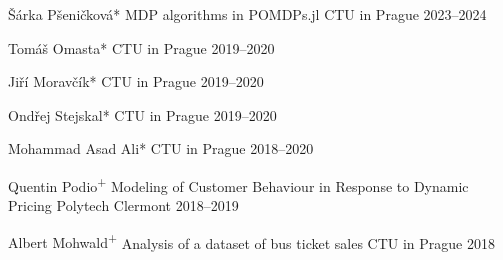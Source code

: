 \begin{cvhonors}
  \cvhonor
    {Šárka Pšeničková*} %
    {MDP algorithms in POMDPs.jl} %
    {CTU in Prague} %
    {2023--2024} %

  \cvhonor
    {Tomáš Omasta*} %
    {} %
    {CTU in Prague} %
    {2019--2020} %

  \cvhonor
    {Jiří Moravčík*} %
    {} %
    {CTU in Prague} %
    {2019--2020} %

  \cvhonor
    {Ondřej Stejskal*} %
    {} %
    {CTU in Prague} %
    {2019--2020} %

  \cvhonor
    {Mohammad Asad Ali*} %
    {} %
    {CTU in Prague} %
    {2018--2020} %

  \cvhonor
    {Quentin Podio\textsuperscript{+}} %
    {Modeling of Customer Behaviour in Response to Dynamic Pricing} %
    {\hspace{-3em}Polytech Clermont} %
    {2018--2019} %

  \cvhonor
    {Albert Mohwald\textsuperscript{+}} %
    {Analysis of a dataset of bus ticket sales} %
    {CTU in Prague} %
    {2018} %

\end{cvhonors}
